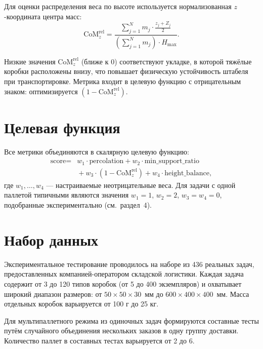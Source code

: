 Для оценки распределения веса по высоте используется нормализованная $z$-координата центра масс:
\[
\text{CoM}_z^{\text{rel}} = \frac{\sum_{j=1}^{N} m_j \cdot \frac{z_j + Z_j}{2}}{\left(\sum_{j=1}^{N} m_j\right) \cdot H_{\max}}.
\]

Низкие значения $\text{CoM}_z^{\text{rel}}$ (ближе к 0) соответствуют укладке, в которой тяжёлые коробки расположены внизу, что повышает физическую устойчивость штабеля при транспортировке. Метрика входит в целевую функцию с отрицательным знаком: оптимизируется $(1 - \text{CoM}_z^{\text{rel}})$.

\section{Целевая функция}

Все метрики объединяются в скалярную целевую функцию:
\[
\begin{split}
\text{score} = {}& w_1 \cdot \text{percolation}
    + w_2 \cdot \text{min\_support\_ratio} \\
&{}+ w_3 \cdot (1 - \text{CoM}_z^{\text{rel}})
    + w_4 \cdot \text{height\_balance},
\end{split}
\]
где $w_1, \ldots, w_4$ --- настраиваемые неотрицательные веса. Для задачи с одной паллетой типичными являются значения $w_1 = 1$, $w_2 = 2$, $w_3 = w_4 = 0$, подобранные экспериментально (см.~раздел~4).

\section{Набор данных}

Экспериментальное тестирование проводилось на наборе из 436 реальных задач, предоставленных компанией-оператором складской логистики. Каждая задача содержит от 3 до 120 типов коробок (от 5 до 400 экземпляров) и охватывает широкий диапазон размеров: от $50 \times 50 \times 30$~мм до $600 \times 400 \times 400$~мм. Масса отдельных коробок варьируется от 100 г до 25 кг.

Для мультипаллетного режима из одиночных задач формируются составные тесты путём случайного объединения нескольких заказов в одну группу доставки. Количество паллет в составных тестах варьируется от 2 до 6.
